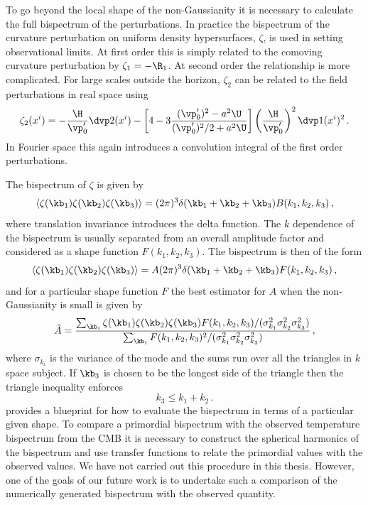 To go beyond the local shape of the non-Gaussianity it is necessary to calculate the full
bispectrum of the perturbations. In practice the bispectrum of the curvature perturbation on
uniform density hypersurfaces, $\zeta$, is used in setting observational limits. At first order this
is simply related to the comoving curvature perturbation by $\zeta_1 = -\R_1$. At second order the
relationship is more complicated. For large scales outside the horizon, $\zeta_2$ can be related to
the field perturbations in real space using \cite{Malik:2005cy}
% 
\begin{equation}
 \zeta_2(x^i) = -\frac{\H}{\vp_0'}\dvp2(x^i) - \left[4 - 3\frac{(\vp_0')^2 - a^2\U}{(\vp_0')^2/2
+a^2\U} \right]\left(\frac{\H}{\vp_0'} \right)^2 \dvp1(x^i)^2\,. 
\end{equation}
% 
In Fourier space this again introduces a convolution integral of the first order perturbations.

The bispectrum of $\zeta$ is given by
% 
\begin{equation}
 \langle \zeta(\kb_1)\zeta(\kb_2)\zeta(\kb_3)\rangle = 
        (2\pi)^3 \delta(\kb_1+\kb_2+\kb_3) B(k_1,k_2,k_3)\,,
\end{equation}
% 
where translation invariance introduces the delta function. The $k$ dependence of the bispectrum 
is usually separated from an overall amplitude factor and considered as a shape function
$F(k_1,k_2,k_3)$. The bispectrum is then of the form \cite{Liguori:2010hx, Babich:2004gb}
% 
\begin{equation}
 \langle \zeta(\kb_1)\zeta(\kb_2)\zeta(\kb_3)\rangle = 
        A (2\pi)^3 \delta(\kb_1 + \kb_2 + \kb_3) F(k_1,k_2,k_3)\,,
\end{equation}
% 
and for a particular shape function $F$ the best estimator for $A$ when the non-Gaussianity is
small is given by \cite{Babich:2004gb}
% 
\begin{equation}
\label{eq:fnlampl-apx}
\hat{A} = \frac{\sum_{\kb_i} \zeta(\kb_1)\zeta(\kb_2)\zeta(\kb_3) F(k_1,k_2,k_3)/ 
                (\sigma^2_{k_1}\sigma^2_{k_2}\sigma^2_{k_3}) }
                {\sum_{\kb_i} F(k_1,k_2,k_3)^2/(\sigma^2_{k_1}\sigma^2_{k_2}\sigma^2_{k_3})} \,,
\end{equation}
% 
where $\sigma_{k_i}$ is the variance of the mode and the sums run over all the triangles in $k$
space subject. If $\kb_3$ is chosen to be the longest side of the triangle then the triangle
inequality enforces
% 
\begin{equation}
 k_3 \le k_1 + k_2\,.
\end{equation}
% 
 provides a blueprint for how to evaluate the bispectrum in terms of a
particular given shape. To compare a primordial bispectrum with the observed temperature bispectrum
from the CMB it is necessary to construct the spherical harmonics of the bispectrum and use
transfer functions to relate the primordial values with the observed values. We have not
carried out this procedure in this thesis. However, one of the goals of our future work is to
undertake such a comparison of the numerically generated bispectrum with the observed quantity. 

